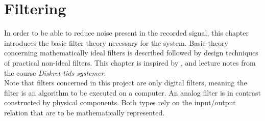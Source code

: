 \chapter{Filtering} \label{ch8}
In order to be able to reduce noise present in the recorded signal, this chapter introduces the basic filter theory necessary for the system. Basic theory concerning mathematically ideal filters is described followed by design techniques of practical non-ideal filters. This chapter is inspired by \cite{chapters 5, 7, DTSP}, \cite{section 3.4.4, FSP} and lecture notes from the course \textit{Diskret-tids systemer}. \\
Note that filters concerned in this project are only digital filters, meaning the filter is an algorithm to be executed on a computer. An analog filter is in contrast constructed by physical components. Both types rely on the input/output relation that are to be mathematically represented.




